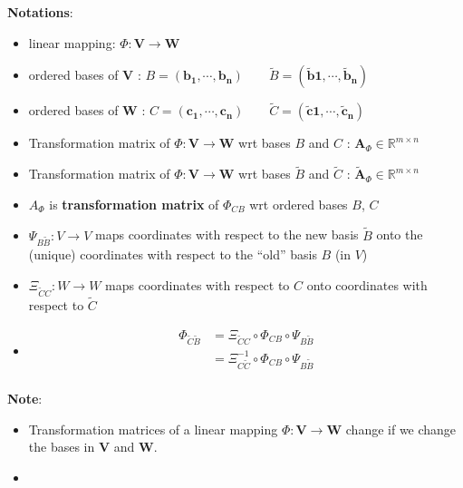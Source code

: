 \noindent\textbf{Notations}:
\begin{itemize}
    \item linear mapping:  $\Phi : \mathbf{V \to W}$

    \item ordered bases of $\mathbf{V}$ : \(         \mathit{B} = \mathbf{(b_1, \cdots , b_n)} \quad\quad \tilde{\mathit{B}} = \mathbf{( \tilde{b}1, \cdots , \tilde{b}_n)}     \)

    \item ordered bases of $\mathbf{W}$ : \( \mathit{C} = \mathbf{(c_1, \cdots , c_n)} \quad\quad \tilde{\mathit{C}} = \mathbf{( \tilde{c}1, \cdots , \tilde{c}_n)} \)

    \item Transformation matrix of $\Phi: \mathbf{V} \to \mathbf{W}$ wrt bases $\mathit{B}$ and $\mathit{C}$ : $\mathbf{A}_\Phi \in \mathbb{R}^{m \times n}$

    \item Transformation matrix of $\Phi: \mathbf{V} \to \mathbf{W}$ wrt bases $\tilde{\mathit{B}}$ and $\tilde{\mathit{C}}$ : $\tilde{\mathbf{A}}_\Phi \in \mathbb{R}^{m \times n}$

    \item $A_\Phi$ is \textbf{transformation matrix} of $\Phi_{CB}$ wrt ordered bases $B$, $C$\\

    \item $\Psi_{B\tilde{B}} : V \to V$ maps coordinates with respect to the new basis $\tilde{B}$ onto the (unique) coordinates with respect to the “old” basis $B$ (in $V$)

    \item $\Xi_{\tilde{C}C} : W \to W$ maps coordinates with respect to $C$ onto coordinates with respect to $\tilde{C}$

    \item  \begin{align}
        \Phi_{\tilde{C}\tilde{B}}  
        &= \Xi_{\tilde{C}C} \circ \Phi_{CB} \circ \Psi_{B\tilde{B}} \\ 
        &= \Xi^{-1}_{C\tilde{C}} \circ \Phi_{CB} \circ \Psi_{B\tilde{B}} \\ 
    \end{align} 
    
\end{itemize}

\vspace{0.2cm}
\noindent \textbf{Note}:
\begin{itemize}
    \item Transformation matrices of a linear mapping $\Phi : \mathbf{V \to W}$ change if we change the bases in $\mathbf{V}$ and $\mathbf{W}$.

    \item 
\end{itemize}

